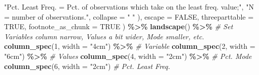 \documentclass[
]{article}
\newenvironment{Shaded}{\begin{snugshade}}{\end{snugshade}}
\newcommand{\AttributeTok}[1]{\textcolor[rgb]{0.13,0.29,0.53}{#1}}
\newcommand{\CommentTok}[1]{\textcolor[rgb]{0.56,0.35,0.01}{\textit{#1}}}
\newcommand{\ConstantTok}[1]{\textcolor[rgb]{0.56,0.35,0.01}{#1}}
\newcommand{\DecValTok}[1]{\textcolor[rgb]{0.00,0.00,0.81}{#1}}
\newcommand{\FunctionTok}[1]{\textcolor[rgb]{0.13,0.29,0.53}{\textbf{#1}}}
\newcommand{\NormalTok}[1]{#1}
\newcommand{\SpecialCharTok}[1]{\textcolor[rgb]{0.81,0.36,0.00}{\textbf{#1}}}
\newcommand{\StringTok}[1]{\textcolor[rgb]{0.31,0.60,0.02}{#1}}
\begin{document}
\begin{Shaded}
\begin{Highlighting}[]
      \StringTok{"\textquotesingle{}Pct. Least Freq.\textquotesingle{} = Pct. of observations which take on the least freq. value;"}\NormalTok{,}
      \StringTok{"\textquotesingle{}N\textquotesingle{} = number of observations."}\NormalTok{,}
      \AttributeTok{collapse =} \StringTok{" "}
\NormalTok{    ),}
    \AttributeTok{escape =} \ConstantTok{FALSE}\NormalTok{,}
    \AttributeTok{threeparttable =} \ConstantTok{TRUE}\NormalTok{,}
    \AttributeTok{footnote\_as\_chunk =} \ConstantTok{TRUE}
\NormalTok{  ) }\SpecialCharTok{\%\textgreater{}\%} 
  \FunctionTok{landscape}\NormalTok{() }\SpecialCharTok{\%\textgreater{}\%}
  \CommentTok{\# Set Variables column narrow, Values a bit wider, Mode smaller, etc.}
  \FunctionTok{column\_spec}\NormalTok{(}\DecValTok{1}\NormalTok{, }\AttributeTok{width =} \StringTok{"4cm"}\NormalTok{) }\SpecialCharTok{\%\textgreater{}\%} \CommentTok{\# Variable}
  \FunctionTok{column\_spec}\NormalTok{(}\DecValTok{2}\NormalTok{, }\AttributeTok{width =} \StringTok{"6cm"}\NormalTok{) }\SpecialCharTok{\%\textgreater{}\%} \CommentTok{\# Values}
  \FunctionTok{column\_spec}\NormalTok{(}\DecValTok{4}\NormalTok{, }\AttributeTok{width =} \StringTok{"2cm"}\NormalTok{) }\SpecialCharTok{\%\textgreater{}\%} \CommentTok{\# Pct. Mode}
  \FunctionTok{column\_spec}\NormalTok{(}\DecValTok{6}\NormalTok{, }\AttributeTok{width =} \StringTok{"2cm"}\NormalTok{) }\CommentTok{\# Pct. Least Freq.}
\end{Highlighting}
\end{Shaded}
\end{document}
